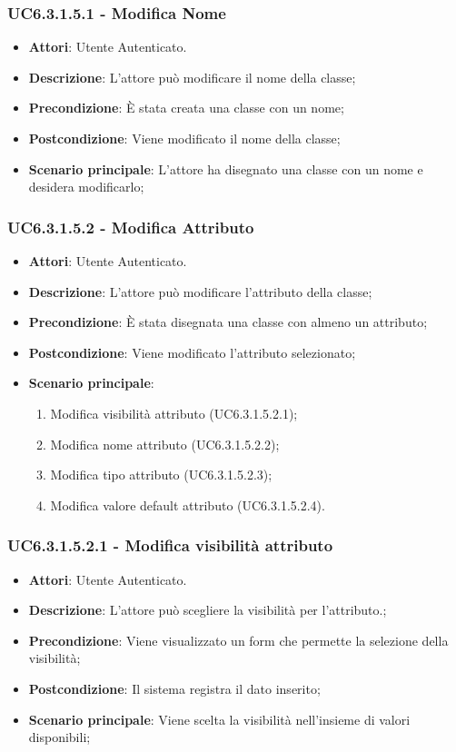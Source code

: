 \subsubsection{UC6.3.1.5.1 - Modifica Nome} 
\label{sssec:UC6.3.1.5.1} 
\begin{itemize} 
\item \textbf{Attori}: Utente Autenticato.
\item \textbf{Descrizione}: L'attore può modificare il nome della classe;
\item \textbf{Precondizione}: È stata creata una classe con un nome;
\item \textbf{Postcondizione}: Viene modificato il nome della classe;
\item \textbf{Scenario principale}: L'attore ha disegnato una classe con un nome e desidera modificarlo;\end{itemize} 
\subsubsection{UC6.3.1.5.2 - Modifica Attributo} 
\label{sssec:UC6.3.1.5.2} 
\begin{itemize} 
\item \textbf{Attori}: Utente Autenticato.
\item \textbf{Descrizione}: L'attore può modificare l'attributo della classe;
\item \textbf{Precondizione}: È stata disegnata una classe con almeno un attributo;
\item \textbf{Postcondizione}: Viene modificato l'attributo selezionato;
\item \textbf{Scenario principale}: \begin{enumerate}\item Modifica visibilità attributo (UC6.3.1.5.2.1);\item Modifica nome attributo (UC6.3.1.5.2.2);\item Modifica tipo attributo (UC6.3.1.5.2.3);\item Modifica valore default attributo (UC6.3.1.5.2.4). 
 \end{enumerate}
\end{itemize} 
\subsubsection{UC6.3.1.5.2.1 - Modifica visibilità attributo} 
\label{sssec:UC6.3.1.5.2.1} 
\begin{itemize} 
\item \textbf{Attori}: Utente Autenticato.
\item \textbf{Descrizione}: L'attore può scegliere la visibilità per l'attributo.;
\item \textbf{Precondizione}: Viene visualizzato un form che permette la selezione della visibilità;
\item \textbf{Postcondizione}: Il sistema registra il dato inserito;
\item \textbf{Scenario principale}: Viene scelta la visibilità nell'insieme di valori disponibili;\end{itemize} 
